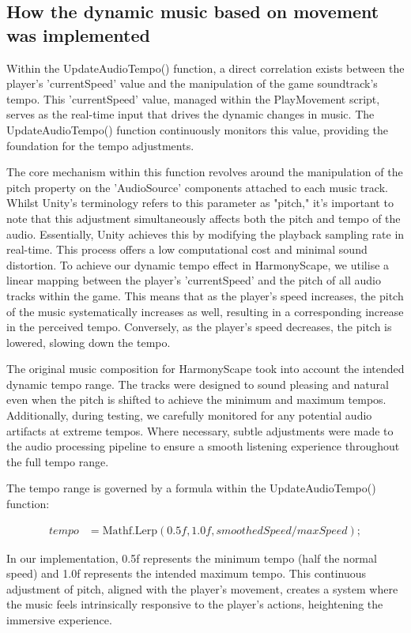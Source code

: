 \documentclass{l4proj}
\begin{document}
\subsection{How the dynamic music based on movement was implemented} 
Within the UpdateAudioTempo() function, a direct correlation exists between the player's 'currentSpeed' value and the manipulation of the game soundtrack's tempo. This 'currentSpeed' value, managed within the PlayMovement script, serves as the real-time input that drives the dynamic changes in music. The UpdateAudioTempo() function continuously monitors this value, providing the foundation for the tempo adjustments.

The core mechanism within this function revolves around the manipulation of the pitch property on the 'AudioSource' components attached to each music track. Whilst Unity's terminology refers to this parameter as "pitch," it's important to note that this adjustment simultaneously affects both the pitch and tempo of the audio. Essentially, Unity achieves this by modifying the playback sampling rate in real-time. This process offers a low computational cost and minimal sound distortion. To achieve our dynamic tempo effect in HarmonyScape, we utilise a linear mapping between the player's 'currentSpeed' and the pitch of all audio tracks within the game. This means that as the player's speed increases, the pitch of the music systematically increases as well, resulting in a corresponding increase in the perceived tempo. Conversely, as the player's speed decreases, the pitch is lowered, slowing down the tempo.

The original music composition for HarmonyScape took into account the intended dynamic tempo range. The tracks were designed to sound pleasing and natural even when the pitch is shifted to achieve the minimum and maximum tempos. Additionally, during testing, we carefully monitored for any potential audio artifacts at extreme tempos. Where necessary, subtle adjustments were made to the audio processing pipeline to ensure a smooth listening experience throughout the full tempo range.

The tempo range is governed by a formula within the UpdateAudioTempo() function:

\begin{align*}
tempo &= \text{Mathf.Lerp}(0.5f, 1.0f, smoothedSpeed / maxSpeed);
\end{align*}

In our implementation, 0.5f represents the minimum tempo (half the normal speed) and 1.0f represents the intended maximum tempo. This continuous adjustment of pitch, aligned with the player's movement, creates a system where the music feels intrinsically responsive to the player's actions, heightening the immersive experience.
\end{document}
